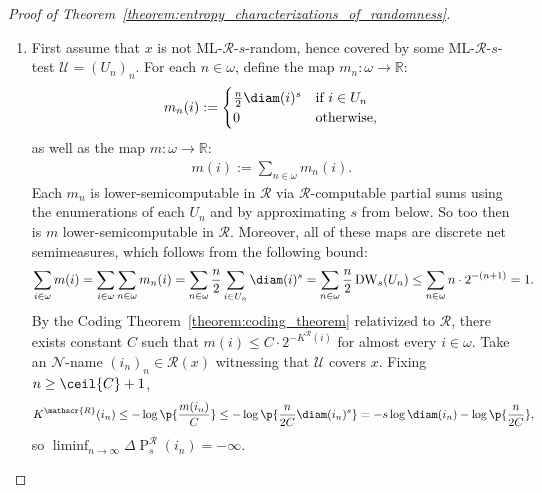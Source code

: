 \begin{proof}[Proof of Theorem~\ref{theorem:entropy_characterizations_of_randomness}]
    \begin{enumerate}[label = (\roman*)]
        \item First assume that $x$ is not ML-$\mathscr{R}$-$s$-random, hence covered by some ML-$\mathscr{R}$-$s$-test $\mathcal{U} = (U_n)_n$. For each $n \in \omega$, define the map $m_n : \omega \to \mathbb{R}$:
        \begin{align*}
            m_n(i) := \begin{cases}
                \frac{n}{2} \diam(i)^s & \text{if } i \in U_n\\
                0 & \text{otherwise},
            \end{cases}
        \end{align*}
        as well as the map $m: \omega \to \mathbb{R}$:
        \begin{align*}
            m(i) := \sum_{n \in \omega} m_n(i).
        \end{align*}
        Each $m_n$ is lower-semicomputable in $\mathscr{R}$ via $\mathscr{R}$-computable partial sums using the enumerations of each $U_n$ and by approximating $s$ from below. So too then is $m$ lower-semicomputable in $\mathscr{R}$. Moreover, all of these maps are discrete net semimeasures, which follows from the following bound:
        \begin{align*}
            \sum_{i \in \omega} m(i) = \sum_{i \in \omega} \sum_{n \in \omega} m_n(i) = \sum_{n \in \omega} \frac{n}{2} \sum_{i \in U_n} \diam(i)^s = \sum_{n \in \omega} \frac{n}{2} \operatorname{DW}_s(U_n) \leq \sum_{n \in \omega} n \cdot 2^{-(n + 1)} = 1.
        \end{align*}
        By the Coding Theorem~\ref{theorem:coding_theorem} relativized to $\mathscr{R}$, there exists constant $C$ such that $m(i) \leq C \cdot 2^{-K^{\mathscr{R}}(i)}$ for almost every $i \in \omega$. Take an $\mathcal{N}$-name $(i_n)_n \in \mathcal{R}(x)$ witnessing that $\mathcal{U}$ covers $x$. Fixing $n \geq \ceil{C} + 1$, 
        \begin{align*}
            K^{\mathscr{R}}(i_n) \leq - \log\p{\frac{m(i_n)}{C}} \leq - \log \p{\frac{n}{2C} \diam(i_n)^s} = -s \log \diam(i_n) - \log \p{\frac{n}{2C}},
        \end{align*}
        so $\liminf_{n \to \infty} \Delta \operatorname{P}^{\mathscr{R}}_s(i_n) = - \infty$. 
        

\end{enumerate}
\end{proof}
